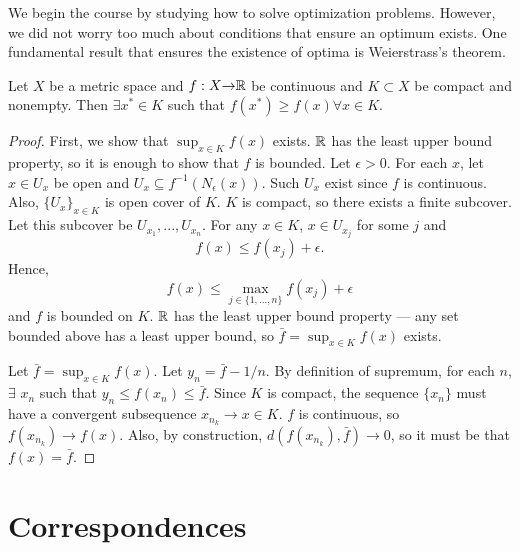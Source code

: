 We begin the course by studying how to solve optimization
problems. However, we did not worry too much about conditions that
ensure an optimum exists. One fundamental result that ensures the
existence of optima is Weierstrass's theorem.
\begin{theorem}[Weierstrass]
  Let $X$ be a metric space and $f:X {\rightarrow} \mathbb{R}$ be continuous and
  $K \subset X$ be compact and nonempty. Then $\exists x^* \in K$ such
  that $f(x^*) \geq f(x) \forall x \in K$.
\end{theorem}
\begin{proof}
  First, we show that $\sup_{x \in K} f(x)$ exists. 
  $\mathbb{R}$ has the least upper bound property, so it is enough to
  show that $f$ is bounded. Let $\epsilon>0$. For each $x$, let $x \in
  U_x$ be open and $U_x \subseteq f^{-1}(N_\epsilon(x))$. Such $U_x$
  exist since $f$ is continuous. Also, $\{U_x\}_{x \in K}$ is open
  cover of $K$. $K$ is compact, so there exists a finite subcover. Let
  this subcover be $U_{x_1}, ..., U_{x_n}$. For any $x \in K$, $x \in
  U_{x_j}$ for some $j$ and 
  \[ f(x) \leq f(x_j) + \epsilon. \]
  Hence,
  \[ f(x) \leq \max_{j\in\{1, ..., n\}} f(x_j) + \epsilon \]
  and $f$ is bounded on $K$. $\mathbb{R}$ has the least upper bound property
  --- any set bounded above has a least upper bound, so
  $\bar{f}=\sup_{x \in K} f(x)$ exists.

  Let $\bar{f} = \sup_{x \in K} f(x)$. Let $y_n = \bar{f} -
  1/n$. By definition of supremum, for each $n$, $\exists$ $x_n$
  such that $y_n \leq f(x_n) \leq \bar{f}$. Since $K$ is compact,
  the sequence $\{x_n\}$ must have a convergent subsequence
  $x_{n_k} \to x \in K$. $f$ is continuous, so $f(x_{n_k}) \to
  f(x)$. Also, by construction, $d(f(x_{n_k}) , \bar{f} ) \to 0$, so
  it must be that $f(x) = \bar{f}$. 
\end{proof}

\section{Correspondences \label{sec:corr}} 


